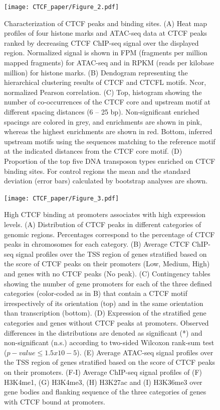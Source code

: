 		\begin{figure}[h!]
			\centering
			\texttt{[image: CTCF\_paper/Figure\_2.pdf]}
  			\caption[two]{Characterization of CTCF peaks and binding sites.
(A) Heat map profiles of four histone marks and ATAC-seq data at CTCF peaks ranked by decreasing CTCF ChIP-seq signal over the displayed region. Normalized signal is shown in FPM (fragments per million mapped fragments) for ATAC-seq and in RPKM (reads per kilobase million) for histone marks.
(B) Dendogram representing the hierarchical clustering results of CTCF and CTCFL motifs. Ncor, normalized Pearson correlation.
(C) Top, histogram showing the number of co-occurrences of the CTCF core and upstream motif at different spacing distances (6 – 25 bp). Non-significant enriched spacings are colored in grey, and enrichments are shown in pink, whereas the highest enrichments are shown in red. Bottom, inferred upstream motifs using the sequences matching to the reference motif at the indicated distances from the CTCF core motif.
(D) Proportion of the top five DNA transposon types enriched on CTCF binding sites. For control regions the mean and the standard deviation (error bars) calculated by bootstrap analyses are shown.}
			\label{two}
		\end{figure}

		\newpage

		\begin{figure}[h!]
			\centering
			\texttt{[image: CTCF\_paper/Figure\_3.pdf]}
  			\caption[three]{High CTCF binding at promoters associates with high expression levels.
(A) Distribution of CTCF peaks in different categories of genomic regions. Percentages correspond to the percentage of CTCF peaks in chromosomes for each category.
(B) Average CTCF ChIP-seq signal profiles over the TSS region of genes stratified based on the score of CTCF peaks on their promoters (Low, Medium, High) and genes with no CTCF peaks (No peak).
(C) Contingency tables showing the number of gene promoters for each of the three defined categories (color-coded as in B) that contain a CTCF motif irrespectively of its orientation (top) and in the same orientation than transcription (bottom).
(D) Expression of the stratified gene categories and genes without CTCF peaks at promoters. Observed differences in the distributions are denoted as significant (*) and non-significant (n.s.) according to two-sided Wilcoxon rank-sum test ($p-value \le 1.5x10-5$).
(E) Average ATAC-seq signal profiles over the TSS region of genes stratified based on the score of CTCF peaks on their promoters.
(F-I) Average ChIP-seq signal profiles of (F) H3K4me1, (G) H3K4me3, (H) H3K27ac and (I) H3K36me3 over gene bodies and flanking sequence of the three categories of genes with CTCF bound at promoters.}
			\label{three}
		\end{figure}

